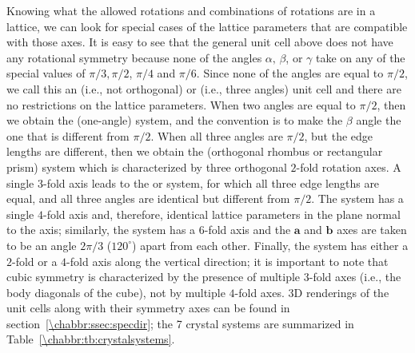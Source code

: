 Knowing what the allowed rotations and combinations of rotations are in a lattice, we can look for special cases of the lattice parameters that are compatible with those axes.  It is easy to see that the general unit cell above does not have any rotational symmetry because none of the angles $\alpha,\,\beta$, or $\gamma$ take on any of the special values of $\pi/3, \pi/2$, $\pi/4$ and $\pi/6$.  Since none of the angles are equal to $\pi/2$, we call this an  (i.e., not orthogonal) or  (i.e., three angles) unit cell and there are no restrictions on the lattice parameters. When two angles are equal to $\pi/2$, then we obtain the  (one-angle) system, and the convention is to make the $\beta$ angle the one that is different from $\pi/2$.  When all three angles are $\pi/2$, but the edge lengths are different, then we obtain the  (orthogonal rhombus or rectangular prism) system which is characterized by three orthogonal $2$-fold rotation axes. A single $3$-fold axis leads to the  or  system, for which all three edge lengths are equal, and all three angles are identical but different from $\pi/2$.  The  system has a single $4$-fold axis and, therefore, identical lattice parameters in the plane normal to the axis; similarly, the  system has a $6$-fold axis and the $\mathbf{a}$ and $\mathbf{b}$ axes are taken to be an angle $2\pi/3$ ($120^{\circ}$) apart from each other.  Finally, the  system has either a $2$-fold or a $4$-fold axis along the vertical direction; it is important to note that cubic symmetry is characterized by the presence of multiple $3$-fold axes (i.e., the body diagonals of the cube), not by multiple $4$-fold axes. 3D renderings of the unit cells along with their symmetry axes can be found in section~\ref{\chabbr:ssec:specdir}; the 7 crystal systems are summarized in Table~\ref{\chabbr:tb:crystalsystems}.

